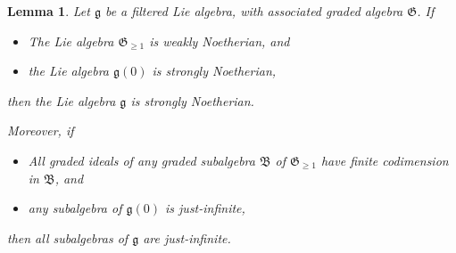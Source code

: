 \documentclass[11pt, letterpaper, reqno]{amsart}
\newtheorem{lemma}[theorem]{Lemma}
\theoremstyle{definition}
\newcommand{\g}{\mathfrak g}
\newcommand{\G}{\mathfrak G}
\newcommand{\fg}{\mathfrak{g}}
\newcommand{\fB}{\mathfrak{B}}
\newcommand{\fG}{\mathfrak{G}}
\begin{document}
\begin{lemma}\label{Noeth-just}
 Let $\g$ be a filtered Lie algebra, with associated graded algebra $\fG$. If

 \begin{itemize}
\item[(a1)]The Lie algebra $\fG_{\geq 1}$
is weakly Noetherian, and

\item[(a2)] the Lie algebra 
$\fg(0)$ is strongly Noetherian,
\end{itemize}

\noindent then the Lie algebra $\g$ is strongly  Noetherian.

\medbreak
Moreover, if 

 \begin{itemize}
\item[(b1)] All  graded ideals   of any graded subalgebra $\fB$ of $\G_{\geq 1}$ have 
finite codimension in $\fB$, and

\item[(b2)] any subalgebra of  $\fg(0)$ is just-infinite,
\end{itemize}

\noindent then all subalgebras of $\g$ are  just-infinite.
\end{lemma}
\end{document}
